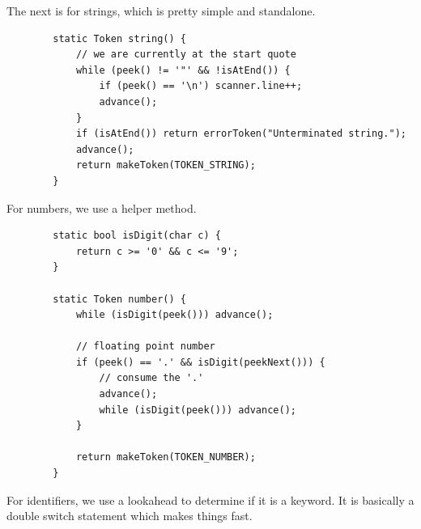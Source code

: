 	The next is for strings, which is pretty simple and standalone. 

	\begin{lstlisting}
		static Token string() {
			// we are currently at the start quote
			while (peek() != '"' && !isAtEnd()) {
				if (peek() == '\n') scanner.line++;
				advance();
			}
			if (isAtEnd()) return errorToken("Unterminated string."); 
			advance();
			return makeToken(TOKEN_STRING);
		}
	\end{lstlisting}

	For numbers, we use a helper method. 

	\begin{lstlisting}
		static bool isDigit(char c) {
			return c >= '0' && c <= '9';
		}

		static Token number() {
			while (isDigit(peek())) advance();
			
			// floating point number
			if (peek() == '.' && isDigit(peekNext())) {
				// consume the '.'
				advance();
				while (isDigit(peek())) advance();
			}

			return makeToken(TOKEN_NUMBER);
		}
	\end{lstlisting}

	For identifiers, we use a lookahead to determine if it is a keyword. It is basically a double switch statement which makes things fast. 

